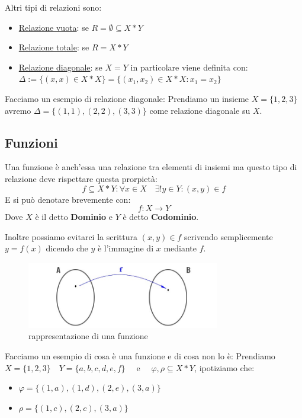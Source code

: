 \documentclass{article}
\theoremstyle{definition}
\begin{document}
Altri tipi di relazioni sono:
\begin{itemize}
        \item \underline{Relazione vuota}: se $ R = \emptyset \subseteq X*Y $ 
        \item \underline{Relazione totale}: se $ R = X*Y $ 
        \item \underline{Relazione diagonale}: se $ X=Y $ in particolare viene definita con: \newline $ \Delta := \{(x,x) \in X*X\} = \{(x_1,x_2) \in X*X : x_1 = x_2\} $  
\end{itemize}
Facciamo un esempio di relazione diagonale: \newline
Prendiamo un insieme $ X = \{1,2,3\} $ avremo $ \Delta = \{(1,1), (2,2),(3,3)\} $ come relazione diagonale su $ X $.



\subsection{Funzioni}
Una funzione è anch'essa una relazione tra elementi di insiemi ma questo tipo di relazione deve rispettare questa prorpietà:
\begin{equation}\label{eq:prop_funzione}
        f \subseteq X*Y : \forall x \in X \quad \exists! y \in Y : (x,y) \in f 
\end{equation}
E si può denotare brevemente con:
\begin{equation*}
        f : X \to Y
\end{equation*}
Dove $ X $ è il detto \textbf{Dominio} e $ Y $ è detto \textbf{Codominio}. \par  
Inoltre possiamo evitarci la scrittura $ (x,y) \in f $ scrivendo semplicemente $ y = f(x) $ dicendo che $ y $ è l'immagine di $ x $ mediante $ f $. \par   

\begin{figure}[h]
        \centering
                \includegraphics[width=0.75\textwidth]{esempio_funzione.jpg}
        \caption{rappresentazione di una funzione}\label{fig:esempio_funzione}
\end{figure}
Facciamo un esempio di cosa è una funzione e di cosa non lo è: \newline
Prendiamo $ X = \{1,2,3\} \quad  Y = \{a,b,c,d,e,f\} \quad $  e $\quad  \varphi, \rho \subseteq X*Y$, ipotiziamo che:
\begin{itemize}
        \item $ \varphi = \{(1,a), (1,d), (2,e), (3,a)\} $ 
        \item $ \rho = \{(1,c), (2,c), (3,a)\} $ 
\end{itemize}
\end{document}
